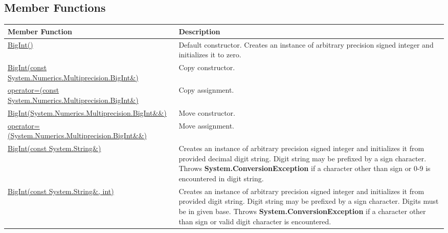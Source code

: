 \documentclass[a4paper,oneside,11.000000pt]{book}
\begin{document}
\subsection{Member Functions}
\begin{flushleft}
\begin{supertabular}[l]{!{\raggedright}p{7.575cm}!{\raggedright}p{7.575cm}}
\textbf{Member Function}
& \textbf{Description}
\\
\hline
\hyperlink{System.Numerics.Multiprecision.BigInt.constructor.P.System.Numerics.Multiprecision.BigInt}{BigInt()}
& Default constructor. Creates an instance of arbitrary precision signed integer and initializes it to zero.

\\
\hyperlink{System.Numerics.Multiprecision.BigInt.constructor.P.System.Numerics.Multiprecision.BigInt.C.R.System.Numerics.Multiprecision.BigInt}{BigInt(const System.\-Numerics.\-Multiprecision.\-BigInt\&\-)}
& Copy constructor.

\\
\hyperlink{System.Numerics.Multiprecision.BigInt.operator.assign.P.System.Numerics.Multiprecision.BigInt.C.R.System.Numerics.Multiprecision.BigInt}{operator=(const System.\-Numerics.\-Multiprecision.\-BigInt\&\-)}
& Copy assignment.

\\
\hyperlink{System.Numerics.Multiprecision.BigInt.constructor.P.System.Numerics.Multiprecision.BigInt.RR.System.Numerics.Multiprecision.BigInt}{BigInt(System.\-Numerics.\-Multiprecision.\-BigInt\&\-\&\-)}
& Move constructor.

\\
\hyperlink{System.Numerics.Multiprecision.BigInt.operator.assign.P.System.Numerics.Multiprecision.BigInt.RR.System.Numerics.Multiprecision.BigInt}{operator=(System.\-Numerics.\-Multiprecision.\-BigInt\&\-\&\-)}
& Move assignment.

\\
\hyperlink{System.Numerics.Multiprecision.BigInt.constructor.P.System.Numerics.Multiprecision.BigInt.C.R.System.String}{BigInt(const System.\-String\&\-)}
& Creates an instance of arbitrary precision signed integer and initializes it from provided decimal digit string.
Digit string may be prefixed by a sign character.
Throws \textbf{System.ConversionException} if a character other than sign or 0-9 is encountered in digit string.

\\
\hyperlink{System.Numerics.Multiprecision.BigInt.constructor.P.System.Numerics.Multiprecision.BigInt.C.R.System.String.int}{BigInt(const System.\-String\&\-, int)}
& Creates an instance of arbitrary precision signed integer and initializes it from provided digit string.
Digit string may be prefixed by a sign character.
Digits must be in given base.
Throws \textbf{System.ConversionException} if a character other than sign or valid digit character is encountered.


\end{supertabular}
\end{flushleft}
\end{document}
